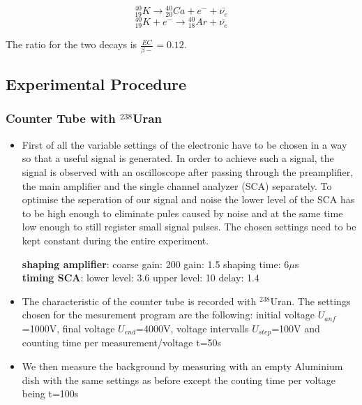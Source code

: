 \documentclass[12pt]{article}
\begin{document}
\[{}^{40}_{19}K \rightarrow {}^{40}_{20}Ca + e^- + \bar{\nu_e}\]
\[{}^{40}_{19}K + e^- \rightarrow {}^{40}_{18}Ar + \bar{\nu_e}\]

The ratio for the two decays is $\frac{EC}{\beta-}=0.12$.\\

\subsection{Experimental Procedure}

\subsubsection{Counter Tube with ${}^{238}$Uran}
\begin{itemize}
	\item First of all the variable settings of the electronic have to be chosen in a way so that a useful signal is generated. In order to achieve such a signal, the signal is observed with an oscilloscope after passing through the preamplifier, the main amplifier and the single channel analyzer (SCA) separately. To optimise the seperation of our signal and noise the lower level of the SCA has to be high enough to eliminate pules caused by noise and at the same time low enough to still register small signal pulses. The chosen settings need to be kept constant during the entire experiment.
	
		\textbf{shaping amplifier}: coarse gain: 200 \hspace{1.5cm} gain: 1.5 \hspace{1cm} shaping time: 6$\mu$s\\
		\textbf{timing SCA}: \hspace{1cm} lower level: 3.6 \hspace{0.5cm} upper level: 10 \hspace{2.5cm} delay: 1.4
	
	\item The characteristic of the counter tube is recorded with ${}^{238}$Uran. The settings chosen for the mesurement program are the following: initial voltage $U_{anf}$=1000V, final voltage $U_{end}$=4000V, voltage intervalls $U_{step}$=100V and counting time per measurement/voltage t=50s
	
	\item We then measure the background by measuring with an empty Aluminium dish with the same settings as before except the couting time per voltage being t=100s
\end{itemize}
\end{document}
